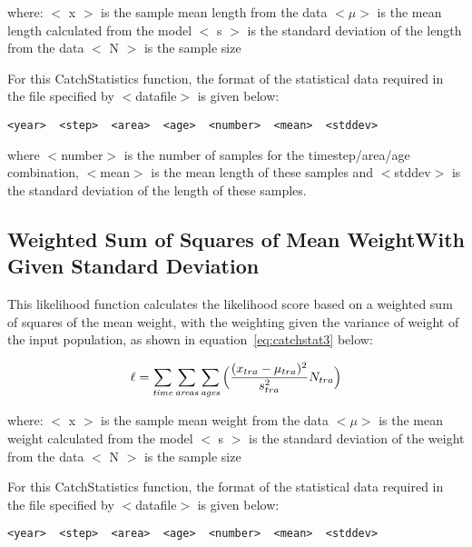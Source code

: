 \documentclass[10pt,twoside]{book}
\begin{document}
where:\newline
$<$ x $>$ is the sample mean length from the data\newline
$<\mu>$ is the mean length calculated from the model\newline
$<$ s $>$ is the standard deviation of the length from the data\newline
$<$ N $>$ is the sample size

\bigskip
For this CatchStatistics function, the format of the statistical data required in the file specified by $<$datafile$>$ is given below:

{\small\begin{verbatim}
<year>  <step>  <area>  <age>  <number>  <mean>  <stddev>
\end{verbatim}}

where $<$number$>$ is the number of samples for the timestep/area/age combination, $<$mean$>$ is the mean length of these samples and $<$stddev$>$ is the standard deviation of the length of these samples.

\subsection{Weighted Sum of Squares of Mean Weight\newline With Given Standard Deviation}
This likelihood function calculates the likelihood score based on a weighted sum of squares of the mean weight, with the weighting given the variance of weight of the input population, as shown in equation~\ref{eq:catchstat3} below:

\begin{equation}\label{eq:catchstat3}
\ell = \sum_{\it time}\sum_{\it areas}\sum_{\it ages} \Big(\frac{(x_{tra}-\mu_{tra})^2} {s_{tra}^2} N_{tra}\Big)
\end{equation}

where:\newline
$<$ x $>$ is the sample mean weight from the data\newline
$<\mu>$ is the mean weight calculated from the model\newline
$<$ s $>$ is the standard deviation of the weight from the data\newline
$<$ N $>$ is the sample size

\bigskip
For this CatchStatistics function, the format of the statistical data required in the file specified by $<$datafile$>$ is given below:

{\small\begin{verbatim}
<year>  <step>  <area>  <age>  <number>  <mean>  <stddev>
\end{verbatim}}
\end{document}
